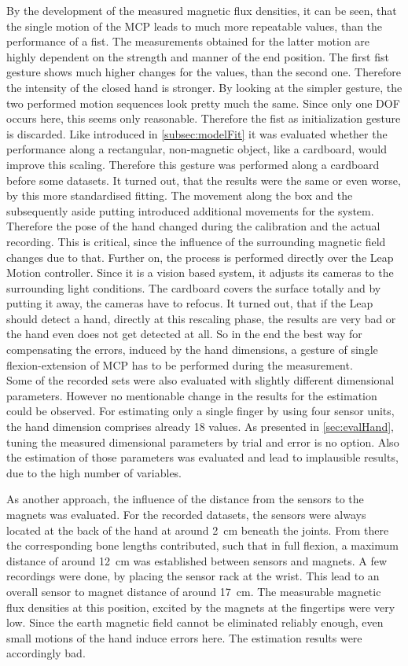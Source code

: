 By the development of the measured magnetic flux densities, it can be seen, that the single motion of the \ac{MCP} leads to much more repeatable values, than the performance of a fist. The measurements obtained for the latter motion are highly dependent on the strength and manner of the end position. The first fist gesture shows much higher changes for the values, than the second one. Therefore the intensity of the closed hand is stronger. By looking at the simpler gesture, the two performed motion sequences look pretty much the same. Since only one \ac{DOF} occurs here, this seems only reasonable. Therefore the fist as initialization gesture is discarded. Like introduced in \ref{subsec:modelFit} it was evaluated whether the performance along a rectangular, non-magnetic object, like a cardboard, would improve this scaling. Therefore this gesture was performed along a cardboard before some datasets. It turned out, that the results were the same or even worse, by this more standardised fitting. The movement along the box and the subsequently aside putting introduced additional movements for the system. Therefore the pose of the hand changed during the calibration and the actual recording. This is critical, since the influence of the surrounding magnetic field changes due to that. Further on, the process is performed directly over the Leap Motion controller. Since it is a vision based system, it adjusts its cameras to the surrounding light conditions. The cardboard covers the surface totally and by putting it away, the cameras have to refocus. It turned out, that if the Leap should detect a hand, directly at this rescaling phase, the results are very bad or the hand even does not get detected at all. So in the end the best way for compensating the errors, induced by the hand dimensions, a gesture of single flexion-extension of \ac{MCP} has to be performed during the measurement.\\
Some of the recorded sets were also evaluated with slightly different dimensional parameters. However no mentionable change in the results for the estimation could be observed. For estimating only a single finger by using four sensor units, the hand dimension comprises already 18 values. As presented in \ref{sec:evalHand}, tuning the measured dimensional parameters by trial and error is no option. Also the estimation of those parameters was evaluated and lead to implausible results, due to the high number of variables. 
\FloatBarrier


As another approach, the influence of the distance from the sensors to the magnets was evaluated. For the recorded datasets, the sensors were always located at the back of the hand at around \SI{2}{\cm} beneath the joints. From there the corresponding bone lengths contributed, such that in full flexion, a maximum distance of around \SI{12}{\cm} was established between sensors and magnets. A few recordings were done, by placing the sensor rack at the wrist. This lead to an overall sensor to magnet distance of around \SI{17}{\cm}. The measurable magnetic flux densities at this position, excited by the magnets at the fingertips were very low. Since the earth magnetic field cannot be eliminated reliably enough, even small motions of the hand induce errors here. The estimation results were accordingly bad.

